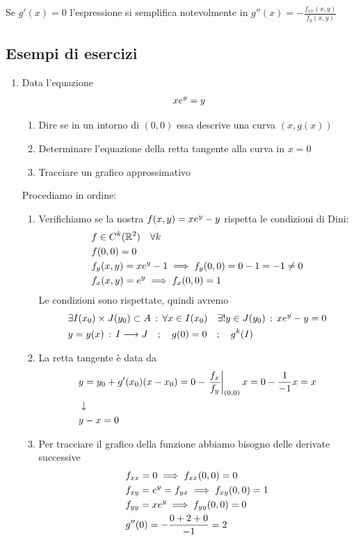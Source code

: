 Se $g'(x)=0$ l'espressione si semplifica notevolmente in $g''(x) = -\frac{f_{xx}(x,y)}{f_y(x,y)}$

\subsection{Esempi di esercizi}

\begin{enumerate}
	\item Data l'equazione
	\begin{align}
		x e^{y}=y
	\end{align}
	
	\begin{enumerate}
		\item Dire se in un intorno di $(0,0)$ essa descrive una curva $(x,g(x))$
		\item Determinare l'equazione della retta tangente alla curva in $x=0$
		\item Tracciare un grafico approssimativo
	\end{enumerate}
	
	\bigskip
	Procediamo in ordine:
	\bigskip
	
	\begin{enumerate}
		\item Verifichiamo se la nostra $f(x,y)= x e^{y}-y$ rispetta le condizioni di Dini:
		\begin{align}
			{}& f \in C^k(\mathbb{R}^2) \quad \forall k\\ 
			&f(0,0)= 0\\
			&f_y(x,y)= x e^{y}-1 \implies f_y(0,0)= 0-1 = -1 \neq 0 \\
			&f_x(x,y)= e^{y} \implies f_x(0,0)= 1
		\end{align}
		Le condizioni sono rispettate, quindi avremo
		\begin{align}
			{}&\exists I(x_0)\times J(y_0) \subset A \, : \, \forall x\in I(x_0) \quad \exists ! y \in J(y_0) \, : \, xe^{y}-y=0\\
			& y = y(x) \, : \, I \longrightarrow J \quad ; \quad g(0)=0 \quad ; \quad g^k(I)
		\end{align}
		
		\item La retta tangente è data da\begin{align}
			{}&y= y_0 + g'(x_0)(x-x_0)= 0 - \left. \frac{f_x}{f_y}\right|_{(0,0)}x= 0 - \frac{1}{-1}x=x\nonumber \\ &\downarrow \nonumber \\
			&y -x =0
		\end{align} 
		
		\item Per tracciare il grafico della funzione abbiamo bisogno delle derivate successive
		\begin{align}
			{}&f_{xx} = 0 \implies f_{xx}(0,0) = 0\\
			&f_{xy} = e^{y}=f_{yx} \implies f_{xy}(0,0) = 1\\
			&f_{yy}= xe^{y}\implies f_{yy}(0,0) = 0\\
			&g''(0)= -\frac{0 +2 + 0}{-1}=2
		\end{align}
		

\end{enumerate}
\end{enumerate}
